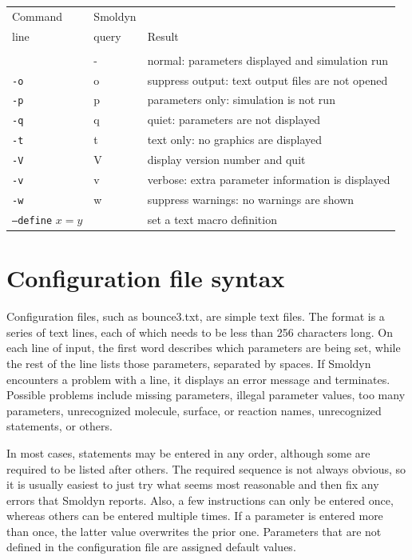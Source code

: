 \documentclass {scrbook}
\newcommand {\ttt} {\texttt}
\begin{document}
\begin{longtable}[c]{lll}
Command & Smoldyn\\
line & query & Result\\
\hline\\
 & - & normal: parameters displayed and simulation run\\
\ttt{-o} & o & suppress output: text output files are not opened\\
\ttt{-p} & p & parameters only: simulation is not run\\
\ttt{-q} & q & quiet: parameters are not displayed\\
\ttt{-t} & t & text only: no graphics are displayed\\
\ttt{-V} & V & display version number and quit\\
\ttt{-v} & v & verbose: extra parameter information is displayed\\
\ttt{-w} & w & suppress warnings: no warnings are shown\\
\ttt{--define} $x=y$ &  & set a text macro definition\\
\end{longtable}

\section{Configuration file syntax}

Configuration files, such as bounce3.txt, are simple text files. The format is a series of text lines, each of which needs to be less than 256 characters long. On each line of input, the first word describes which parameters are being set, while the rest of the line lists those parameters, separated by spaces. If Smoldyn encounters a problem with a line, it displays an error message and terminates. Possible problems include missing parameters, illegal parameter values, too many parameters, unrecognized molecule, surface, or reaction names, unrecognized statements, or others.

In most cases, statements may be entered in any order, although some are required to be listed after others. The required sequence is not always obvious, so it is usually easiest to just try what seems most reasonable and then fix any errors that Smoldyn reports. Also, a few instructions can only be entered once, whereas others can be entered multiple times. If a parameter is entered more than once, the latter value overwrites the prior one. Parameters that are not defined in the configuration file are assigned default values.
\end{document}

